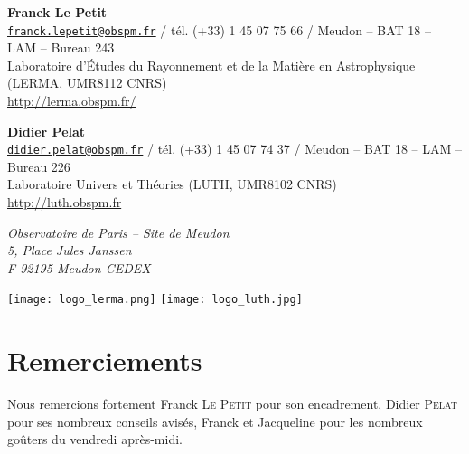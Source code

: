 \begin{center}
{\textbf{Franck Le Petit} \\
\href{mailto:franck.lepetit@obspm.fr}
{\tt franck.lepetit@obspm.fr} / tél. (+33) 1 45 07 75 66 / Meudon – BAT 18 – LAM – Bureau 243 \\
Laboratoire d’Études du Rayonnement et de la Matière en Astrophysique (LERMA, UMR8112 CNRS) \\
\url{http://lerma.obspm.fr/}

\textbf{Didier Pelat} \\
\href{mailto:didier.pelat@obspm.fr}
{\tt didier.pelat@obspm.fr} / tél. (+33) 1 45 07 74 37 / Meudon – BAT 18 – LAM – Bureau 226 \\
Laboratoire Univers et Théories (LUTH, UMR8102 CNRS) \\
\url{http://luth.obspm.fr}

\textit{Observatoire de Paris – Site de Meudon\\
5, Place Jules Janssen\\
F-92195 Meudon CEDEX}
} %

\vspace{0.5cm}

\texttt{[image: logo\_lerma.png]} \hfill \texttt{[image: logo\_luth.jpg]}

\end{center}

\vfill
\hfill \makeatletter \@date \makeatother

\newpage

\thispagestyle{empty}

\section*{Remerciements}

Nous remercions fortement Franck \textsc{Le Petit} pour son encadrement, Didier
\textsc{Pelat} pour ses nombreux conseils avisés, Franck et Jacqueline pour les nombreux
goûters du vendredi après-midi.

\tableofcontents

